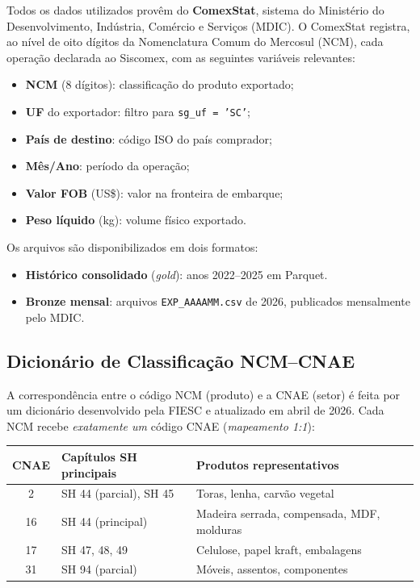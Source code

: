 \documentclass[12pt, a4paper]{article}
\begin{document}
Todos os dados utilizados provêm do \textbf{ComexStat}, sistema do Ministério
do Desenvolvimento, Indústria, Comércio e Serviços (MDIC). O ComexStat
registra, ao nível de oito dígitos da Nomenclatura Comum do Mercosul (NCM),
cada operação declarada ao Siscomex, com as seguintes variáveis relevantes:

\begin{itemize}[noitemsep]
  \item \textbf{NCM} (8 dígitos): classificação do produto exportado;
  \item \textbf{UF} do exportador: filtro para \texttt{sg\_uf = 'SC'};
  \item \textbf{País de destino}: código ISO do país comprador;
  \item \textbf{Mês/Ano}: período da operação;
  \item \textbf{Valor FOB} (US\$): valor na fronteira de embarque;
  \item \textbf{Peso líquido} (kg): volume físico exportado.
\end{itemize}

Os arquivos são disponibilizados em dois formatos:
\begin{itemize}[noitemsep]
  \item \textbf{Histórico consolidado} (\textit{gold}): anos 2022--2025 em Parquet.
  \item \textbf{Bronze mensal}: arquivos \texttt{EXP\_AAAAMM.csv} de 2026,
    publicados mensalmente pelo MDIC.
\end{itemize}

\subsection{Dicionário de Classificação NCM--CNAE}

A correspondência entre o código NCM (produto) e a CNAE (setor) é feita por
um dicionário desenvolvido pela FIESC e atualizado em abril de 2026.
Cada NCM recebe \emph{exatamente um} código CNAE (\textit{mapeamento 1:1}):

\begin{center}
\renewcommand{\arraystretch}{1.3}
\begin{tabular}{cll}
\toprule
\textbf{CNAE} & \textbf{Capítulos SH principais} & \textbf{Produtos representativos} \\
\midrule
2  & SH 44 (parcial), SH 45 & Toras, lenha, carvão vegetal \\
16 & SH 44 (principal)       & Madeira serrada, compensada, MDF, molduras \\
17 & SH 47, 48, 49           & Celulose, papel kraft, embalagens \\
31 & SH 94 (parcial)         & Móveis, assentos, componentes \\
\bottomrule
\end{tabular}
\end{center}
\end{document}
